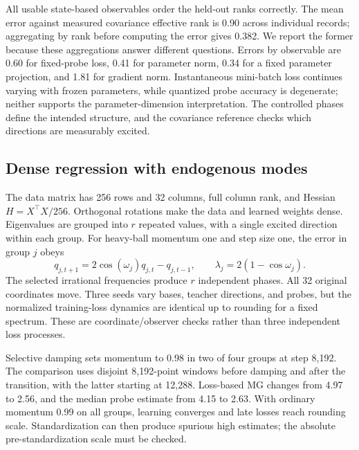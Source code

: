 {All usable state-based observables order the held-out ranks correctly. The mean error against measured covariance effective rank is 0.90 across individual records; aggregating by rank before computing the error gives 0.382. We report the former because these aggregations answer different questions. Errors by observable are 0.60 for fixed-probe loss, 0.41 for parameter norm, 0.34 for a fixed parameter projection, and 1.81 for gradient norm. Instantaneous mini-batch loss continues varying with frozen parameters, while quantized probe accuracy is degenerate; neither supports the parameter-dimension interpretation. The controlled phases define the intended structure, and the covariance reference checks which directions are measurably excited.

\subsection{Dense regression with endogenous modes}
The data matrix has 256 rows and 32 columns, full column rank, and Hessian $H=X^\top X/256$. Orthogonal rotations make the data and learned weights dense. Eigenvalues are grouped into $r$ repeated values, with a single excited direction within each group. For heavy-ball momentum one and step size one, the error in group $j$ obeys
\[
q_{j,t+1}=2\cos(\omega_j)q_{j,t}-q_{j,t-1},
\qquad \lambda_j=2(1-\cos\omega_j).
\]
The selected irrational frequencies produce $r$ independent phases. All 32 original coordinates move. Three seeds vary bases, teacher directions, and probes, but the normalized training-loss dynamics are identical up to rounding for a fixed spectrum. These are coordinate/observer checks rather than three independent loss processes.

\begin{table}[h]
\centering\small
\caption{}

\end{table}

Selective damping sets momentum to 0.98 in two of four groups at step 8,192. The comparison uses disjoint 8,192-point windows before damping and after the transition, with the latter starting at 12,288. Loss-based MG changes from 4.97 to 2.56, and the median probe estimate from 4.15 to 2.63. With ordinary momentum 0.99 on all groups, learning converges and late losses reach rounding scale. Standardization can then produce spurious high estimates; the absolute pre-standardization scale must be checked.

}
